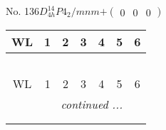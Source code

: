 \documentclass[fleqn,9pt,landscape]{jsarticle}
\begin{document}
\newpage
No. 136\quad$D_{4h}^{14}$\quad$P4_2/mnm$\quad[ tetragonal ]\quad$+\begin{pmatrix} 0 & 0 & 0 \end{pmatrix}$
\begin{center}
\renewcommand{\arraystretch}{1.2}
\begin{longtable}{ccccccc}
 \hline \hline
WL & 1 & 2 & 3 & 4 & 5 & 6 \\ \hline \endfirsthead

\multicolumn{6}{l}{\tablename\ \thetable{}} \\
 \hline \hline
WL & 1 & 2 & 3 & 4 & 5 & 6 \\ \hline \endhead

 \hline \hline
\multicolumn{6}{r}{\footnotesize\it continued ...} \\ \endfoot

 \hline \hline
\multicolumn{6}{r}{} \\ \endlastfoot


\end{longtable}
\end{center}
\end{document}
